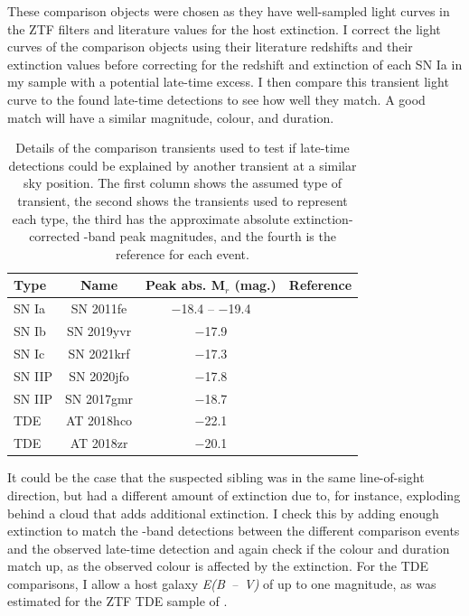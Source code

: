 \documentclass[a4paper,oneside,12pt, class=Latex/Classes/PhDthesisPSnPDF, crop=false]{standalone}
\begin{document}
These comparison objects were chosen as they have well-sampled light curves in the ZTF filters and literature values for the host extinction. I correct the light curves of the comparison objects using their literature redshifts and their extinction values before correcting for the redshift and extinction of each SN Ia in my sample with a potential late-time excess. I then compare this transient light curve to the found late-time detections to see how well they match. A good match will have a similar magnitude, colour, and duration.

\begin{table}
 \centering
 \caption[Details of the used comparison transients.]{Details of the comparison transients used to test if late-time detections could be explained by another transient at a similar sky position. The first column shows the assumed type of transient, the second shows the transients used to represent each type, the third has the approximate absolute extinction-corrected \ztfr-band peak magnitudes, and the fourth is the reference for each event.}
 \begin{tabular}{lccc}
  \hline
   Type & Name & Peak abs. M$_{r}$ (mag.) & Reference\\
   \hline
   SN Ia & SN 2011fe & $-$18.4 -- $-$19.4 & \citet{spec_HST}\\
   SN Ib & SN 2019yvr & $-$17.9 & \citet{Ib_ex}\\
   SN Ic & SN 2021krf & $-$17.3 & \citet{21krf_ext}\\
   SN IIP & SN 2020jfo & $-$17.8 & \citet{IIp_ext}\\
   SN IIP & SN 2017gmr & $-$18.7 & \citet{2017gmr}\\
   TDE & AT 2018hco & $-$22.1 & \citet{TDE_ext}\\
   TDE & AT 2018zr & $-$20.1 & \citet{TDE_ext}\\
   \hline
 \end{tabular}
 \label{alt_trans}
\end{table}

It could be the case that the suspected sibling was in the same line-of-sight direction, but had a different amount of extinction due to, for instance, exploding behind a cloud that adds additional extinction. I check this by adding enough extinction to match the \ztfr-band detections between the different comparison events and the observed late-time detection and again check if the colour and duration match up, as the observed colour is affected by the extinction. For the TDE comparisons, I allow a host galaxy \textit{E(B~--~V)} of up to one magnitude, as was estimated for the ZTF TDE sample of \citet{TDE_host_ext_range}.
\end{document}
